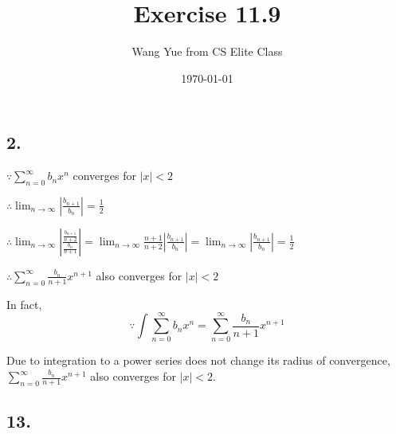 \documentclass{article}
\begin{document}
    \title{Exercise 11.9}
    \author{Wang Yue from CS Elite Class}
    \date{\today}

    \maketitle

    \subsection*{2.}

    $\because \sum_{n=0}^\infty b_n x^n$ converges for $|x| < 2$

    $\therefore \lim_{n\to\infty} |\frac{b_{n+1}}{b_n}| = \frac{1}{2}$

    $\therefore \lim_{n\to\infty} |\frac{\frac{b_{n+1}}{n+2}}{\frac{b_n}{n+1}}| = \lim_{n\to\infty}\frac{n+1}{n+2}|\frac{b_{n+1}}{b_n}| = \lim_{n\to\infty}|\frac{b_{n+1}}{b_n}| = \frac 1 2$

    $\therefore \sum_{n=0}^\infty \frac{b_n}{n+1}x^{n+1}$ also converges for $|x| < 2$

    In fact, $$\because \int \sum_{n=0}^\infty b_n x^n = \sum_{n=0}^\infty \frac{b_n}{n+1} x^{n+1}$$

    Due to integration to a power series does not change its radius of convergence, $\sum_{n=0}^\infty \frac{b_n}{n+1}x^{n+1}$ also converges for $|x| < 2$.

    \subsection*{13.}
\end{document}
